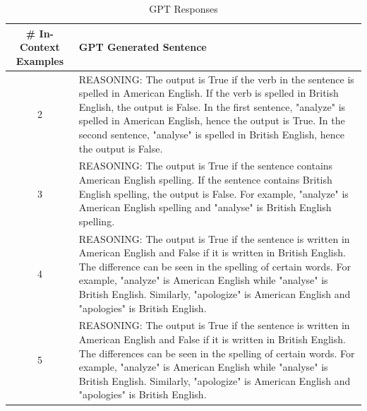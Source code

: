 \documentclass{article}
\begin{document}
\begin{table}[h!]
\begin{tabular}{|c|p{9cm}|}
\hline
\textbf{\# In-Context Examples} & \textbf{GPT Generated Sentence} \\
\hline
2 & REASONING: The output is True if the verb in the sentence is spelled in American English. If the verb is spelled in British English, the output is False. In the first sentence, "analyze" is spelled in American English, hence the output is True. In the second sentence, "analyse" is spelled in British English, hence the output is False. \\
\hline
3 & REASONING: The output is True if the sentence contains American English spelling. If the sentence contains British English spelling, the output is False. For example, "analyze" is American English spelling and "analyse" is British English spelling. \\
\hline
4 & REASONING: The output is True if the sentence is written in American English and False if it is written in British English. The difference can be seen in the spelling of certain words. For example, "analyze" is American English while "analyse" is British English. Similarly, "apologize" is American English and "apologies" is British English. \\
\hline
5 & REASONING: The output is True if the sentence is written in American English and False if it is written in British English. The differences can be seen in the spelling of certain words. For example, "analyze" is American English while "analyse" is British English. Similarly, "apologize" is American English and "apologies" is British English. \\
\hline
\end{tabular}
\caption{GPT Responses}
\label{tab:gpt_responses}
\end{table}
\end{document}
